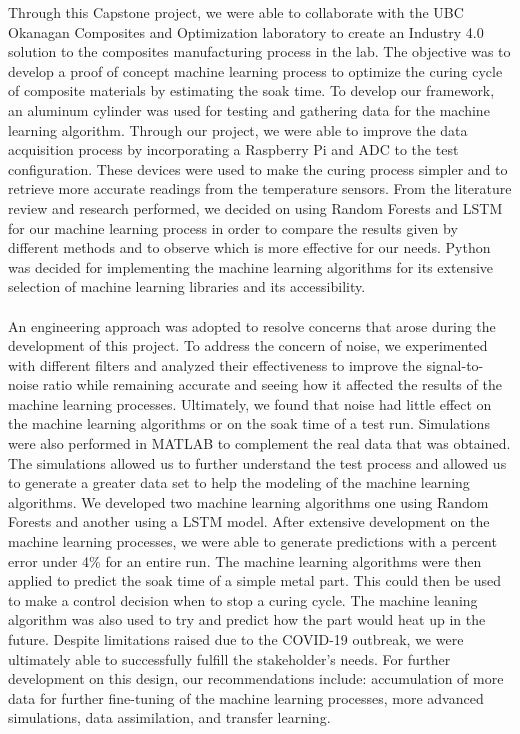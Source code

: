 Through this Capstone project, we were able to collaborate with the UBC Okanagan Composites and Optimization laboratory to create an Industry 4.0 solution to the composites manufacturing process in the lab. The objective was to develop a proof of concept machine learning process to optimize the curing cycle of composite materials by estimating the soak time. To develop our framework, an aluminum cylinder was used for testing and gathering data for the machine learning algorithm. Through our project, we were able to improve the data acquisition process by incorporating a Raspberry Pi and ADC to the test configuration. These devices were used to make the curing process simpler and to retrieve more accurate readings from the temperature sensors. From the literature review and research performed, we decided on using Random Forests and LSTM for our machine learning process in order to compare the results given by different methods and to observe which is more effective for our needs. Python was decided for implementing the machine learning algorithms for its extensive selection of machine learning libraries and its accessibility. \\\\
An engineering approach was adopted to resolve concerns that arose during the development of this project. To address the concern of noise, we experimented with different filters and analyzed their effectiveness to improve the signal-to-noise ratio while remaining accurate and seeing how it affected the results of the machine learning processes. Ultimately, we found that noise had little effect on the machine learning algorithms or on the soak time of a test run. Simulations were also performed in MATLAB to complement the real data that was obtained. The simulations allowed us to further understand the test process and allowed us to generate a greater data set to help the modeling of the machine learning algorithms. We developed two machine learning algorithms one using Random Forests and another using a LSTM model. After extensive development on the machine learning processes, we were able to generate predictions with a percent error under 4\% for an entire run. The machine learning algorithms were then applied to predict the soak time of a simple metal part. This could then be used to make a control decision when to stop a curing cycle. The machine leaning algorithm was also used to try and predict how the part would heat up in the future. Despite limitations raised due to the COVID-19 outbreak, we were ultimately able to successfully fulfill the stakeholder's needs. For further development on this design, our recommendations include: accumulation of more data for further fine-tuning of the machine learning processes, more advanced simulations, data assimilation, and transfer learning. 